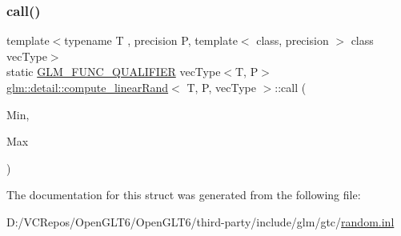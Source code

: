 \subsubsection{\texorpdfstring{call()}{call()}}
{\footnotesize\ttfamily template$<$typename T , precision P, template$<$ class, precision $>$ class vec\+Type$>$ \\
static \mbox{\hyperlink{setup_8hpp_a33fdea6f91c5f834105f7415e2a64407}{G\+L\+M\+\_\+\+F\+U\+N\+C\+\_\+\+Q\+U\+A\+L\+I\+F\+I\+ER}} vec\+Type$<$T, P$>$ \mbox{\hyperlink{structglm_1_1detail_1_1compute__linear_rand}{glm\+::detail\+::compute\+\_\+linear\+Rand}}$<$ T, P, vec\+Type $>$\+::call (\begin{DoxyParamCaption}\item[{vec\+Type$<$ T, P $>$ const \&}]{Min,  }\item[{vec\+Type$<$ T, P $>$ const \&}]{Max }\end{DoxyParamCaption})\hspace{0.3cm}{\ttfamily [static]}}



The documentation for this struct was generated from the following file\+:\begin{DoxyCompactItemize}
\item 
D\+:/\+V\+C\+Repos/\+Open\+G\+L\+T6/\+Open\+G\+L\+T6/third-\/party/include/glm/gtc/\mbox{\hyperlink{random_8inl}{random.\+inl}}\end{DoxyCompactItemize}
